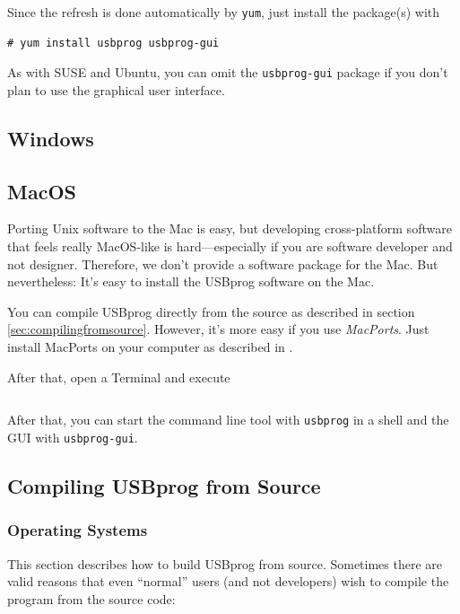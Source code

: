 \documentclass[bibtotoc,UKenglish,halfparskip,oneside,DIV12]{scrreprt}
\begin{document}
Since the refresh is done automatically by \texttt{yum}, just install the package(s) with

\begin{lstlisting}[style=inline]
# yum install usbprog usbprog-gui
\end{lstlisting}

As with SUSE and Ubuntu, you can omit the \texttt{usbprog-gui} package if you don't plan to use the
graphical user interface.


\subsection{Windows}

\subsection{MacOS}

Porting Unix software to the Mac is easy, but developing cross-platform software that feels really
MacOS-like is hard---especially if you are software developer and not designer.  Therefore, we don't
provide a software package for the Mac. But nevertheless: It's easy to install the USBprog software
on the Mac.

You can compile USBprog directly from the source as described in section
\vref{sec:compilingfromsource}. However, it's more easy if you use \emph{MacPorts}. Just install
MacPorts on your computer as described in \cite{InstallingMacports}.

After that, open a Terminal and execute

\begin{lstlisting}[style=inline]
% sudo port install usbprog
\end{lstlisting}

After that, you can start the command line tool with \texttt{usbprog} in a shell and the GUI with
\texttt{usbprog-gui}.


\subsection{Compiling USBprog from Source}
\label{sec:compilingfromsource}

\subsubsection{Operating Systems}

This section describes how to build USBprog from source. Sometimes there are valid reasons that even
``normal'' users (and not developers) wish to compile the program from the source code:
\end{document}
